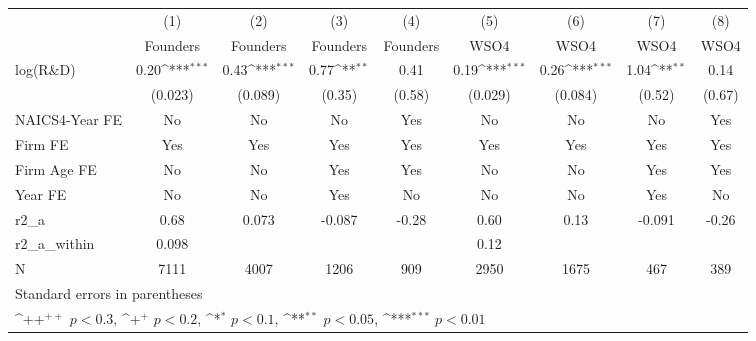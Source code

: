 {
\def\sym#1{\ifmmode^{#1}\else\(^{#1}\)\fi}
\begin{tabular}{l*{8}{c}}
\toprule
                    &\multicolumn{1}{c}{(1)}&\multicolumn{1}{c}{(2)}&\multicolumn{1}{c}{(3)}&\multicolumn{1}{c}{(4)}&\multicolumn{1}{c}{(5)}&\multicolumn{1}{c}{(6)}&\multicolumn{1}{c}{(7)}&\multicolumn{1}{c}{(8)}\\
                    &\multicolumn{1}{c}{Founders}&\multicolumn{1}{c}{Founders}&\multicolumn{1}{c}{Founders}&\multicolumn{1}{c}{Founders}&\multicolumn{1}{c}{WSO4}&\multicolumn{1}{c}{WSO4}&\multicolumn{1}{c}{WSO4}&\multicolumn{1}{c}{WSO4}\\
\midrule
log(R\&D)           &        0.20\sym{***}&        0.43\sym{***}&        0.77\sym{**} &        0.41         &        0.19\sym{***}&        0.26\sym{***}&        1.04\sym{**} &        0.14         \\
                    &     (0.023)         &     (0.089)         &      (0.35)         &      (0.58)         &     (0.029)         &     (0.084)         &      (0.52)         &      (0.67)         \\
\addlinespace
NAICS4-Year FE      &          No         &          No         &          No         &         Yes         &          No         &          No         &          No         &         Yes         \\
\addlinespace
Firm FE             &         Yes         &         Yes         &         Yes         &         Yes         &         Yes         &         Yes         &         Yes         &         Yes         \\
\addlinespace
Firm Age FE         &          No         &          No         &         Yes         &         Yes         &          No         &          No         &         Yes         &         Yes         \\
\addlinespace
Year FE             &          No         &          No         &         Yes         &          No         &          No         &          No         &         Yes         &          No         \\
\midrule
r2\_a                &        0.68         &       0.073         &      -0.087         &       -0.28         &        0.60         &        0.13         &      -0.091         &       -0.26         \\
r2\_a\_within         &       0.098         &                     &                     &                     &        0.12         &                     &                     &                     \\
N                   &        7111         &        4007         &        1206         &         909         &        2950         &        1675         &         467         &         389         \\
\bottomrule
\multicolumn{9}{l}{\footnotesize Standard errors in parentheses}\\
\multicolumn{9}{l}{\footnotesize \sym{++} \(p<0.3\), \sym{+} \(p<0.2\), \sym{*} \(p<0.1\), \sym{**} \(p<0.05\), \sym{***} \(p<0.01\)}\\
\end{tabular}
}
